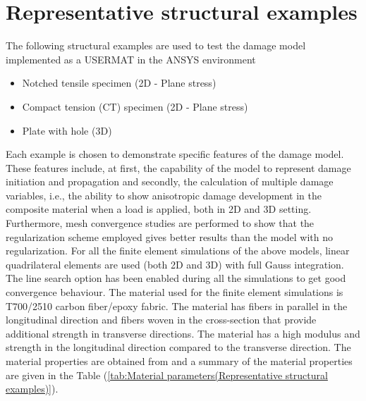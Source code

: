 \documentclass[12pt,openright,twoside]{report}
\begin{document}
\section{Representative structural examples}
\indent\indent\indent The following structural examples are used to test the damage model implemented as a USERMAT in the ANSYS environment
\begin{itemize}
\item Notched tensile specimen (2D - Plane stress)
\item Compact tension (CT) specimen (2D - Plane stress)
\item Plate with hole (3D)
\end{itemize}
Each example is chosen to demonstrate specific features of the damage model. These features include, at first, the capability of the model to represent damage initiation and propagation and secondly, the calculation of multiple damage variables, i.e., the ability to show anisotropic damage development in the composite material when a load is applied, both in 2D and 3D setting. Furthermore, mesh convergence studies are performed to show that the regularization scheme employed gives better results than the model with no regularization. For all the finite element simulations of the above models, linear quadrilateral elements are used (both 2D and 3D) with full Gauss integration. The line search option has been enabled during all the simulations to get good convergence behaviour. The material used for the finite element simulations is T700/2510 carbon fiber/epoxy fabric. The material has fibers in parallel in the longitudinal direction and fibers woven in the cross-section that provide additional strength in transverse directions. The material has a high modulus and strength in the longitudinal direction compared to the transverse direction. The material properties are obtained from \citep{jiang2018evaluations} and a summary of the material properties are given in the Table (\ref{tab:Material parameters(Representative structural examples)}). \\
\end{document}
